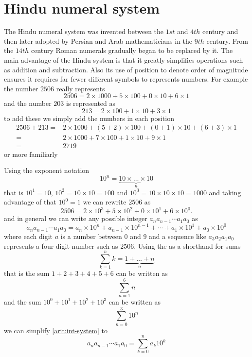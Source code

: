 \section{Hindu numeral system}
The Hindu numeral system was invented between the $1st$ and $4th$ century and then later adopted by Persian and Arab mathematicians in the $9th$ century. From the $14th$ century Roman numerals gradually began to be replaced by it. The main advantage of the Hindu system is that it greatly simplifies operations such as addition and subtraction. Also its use of position to denote order of magnitude ensures it requires far fewer different symbols to represents numbers. For example the number $2506$ really represents
\[
2506 = 2 \times 1000 + 5 \times 100 + 0 \times 10 + 6 \times 1
\]
and the number $203$ is represented as 
\[
213 = 2 \times 100 + 1 \times 10 + 3 \times 1
\]
to add these we simply add the numbers in each position
\begin{align*}
2506 + 213 =& 2 \times 1000 + (5+2) \times 100 + (0+1) \times 10 + (6+3) \times 1 \\
           =& 2 \times 1000 + 7 \times 100 + 1 \times 10 + 9 \times 1 \\
           =& 2719 
\end{align*}
or more familiarly 
\begin{figure}[H]
\centering
{}
\end{figure}

Using the exponent notation 
\[
10^{n} = \underbrace{10 \times \dots \times 10}_{n}
\]
that is $10^1 = 10$, $10^2 = 10 \times 10 = 100$ and $10^3 = 10 \times 10 \times 10 = 1000$ and taking advantage of that $10^0 = 1$ we can rewrite $2506$ as
\[
2506 = 2 \times 10^{3} + 5 \times 10^{2} + 0 \times 10^{1} + 6 \times 10^{0}.
\]
and in general we can write any possible integer $a_{n}a_{n-1} \cdots a_{1}a_{0}$ as
\begin{equation}\label{arit:int-system}
a_{n}a_{n-1} \cdots a_{1}a_{0} = a_{n} \times 10^{n} + a_{n-1} \times 10^{n-1} + \cdots + a_{1} \times 10^{1} + a_{0} \times 10^{0} 
\end{equation}
where each digit $a$ is a number between $0$ and $9$ and a sequence like $a_{3}a_{2}a_{1}a_{0}$ represents a four digit number such as $2506$. Using the  as a shorthand for sums 
\[
\sum_{k=1}^{n} k = \underbrace{1 + \dots + n}_{n}
\]
that is the sum $1 + 2 + 3 + 4 + 5 + 6$ can be written as 
\[
\sum_{n=1}^{6} n 
\]
and the sum $10^0 + 10^1 + 10^2 + 10^3$ can be written as
\[
\sum_{n=0}^{3} 10^n
\]
we can simplify \ref{arit:int-system} to
\begin{equation}
a_{n}a_{n-1} \cdots a_{1}a_{0} = \sum_{k=0}^{n} a_{k}10^{k}
\end{equation}

